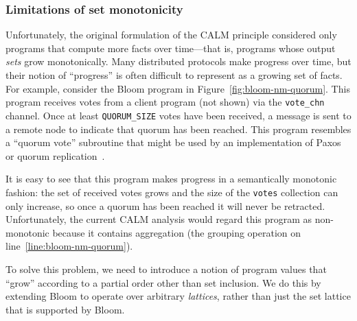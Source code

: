 \subsubsection{Limitations of set monotonicity}
Unfortunately, the original formulation of the CALM principle considered only
programs that compute more facts over time---that is, programs whose output
\emph{sets} grow monotonically. Many distributed protocols make progress
over time, but their notion of ``progress'' is often difficult to represent as a
growing set of facts. For example, consider the Bloom program in
Figure~\ref{fig:bloom-nm-quorum}. This program receives votes from a client
program (not shown) via the \texttt{vote\_chn} channel. Once at least
\texttt{QUORUM\_SIZE} votes have been received, a message is sent to a remote
node to indicate that quorum has been reached. This program resembles a ``quorum
vote'' subroutine that might be used by an implementation of
Paxos~\cite{Lamport1998} or quorum replication~\cite{Gifford1979}.

It is easy to see that this program makes progress in a semantically monotonic
fashion: the set of received votes grows and the size of the \texttt{votes}
collection can only increase, so once a quorum has been reached it will never be
retracted. Unfortunately, the current CALM analysis would regard this program as
non-monotonic because it contains aggregation (the grouping operation on
line~\ref{line:bloom-nm-quorum}).

To solve this problem, we need to introduce a notion of program values that
``grow'' according to a partial order other than set inclusion. We do this by
extending Bloom to operate over arbitrary \emph{lattices}, rather than just the
set lattice that is supported by Bloom.


